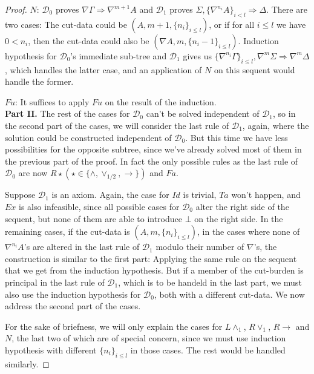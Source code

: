 \begin{proof}
   $N$: $\mathcal{D}_0$ proves $\nabla \Gamma \Rightarrow \nabla^{m+1} A$ and $\mathcal{D}_1$ proves $\Sigma, \{\nabla^{n_i} A\}_{i<l} \Rightarrow \Delta$. There are two cases: The cut-data could be $(A, m+1, \{n_i\}_{i \leq l})$, or if for all $i \leq l$ we have $0 < n_i$, then the cut-data could also be $(\nabla A, m, \{n_i-1\}_{i \leq l})$. Induction hypothesis for $\mathcal{D}_0$'s immediate sub-tree and $\mathcal{D}_1$ gives us $\{\nabla^{n_i}\Gamma\}_{i \leq l}, \nabla^m \Sigma \Rightarrow \nabla^m \Delta$, which handles the latter case, and an application of $N$ on this sequent would handle the former.
  
   $Fu$: It suffices to apply $Fu$ on the result of the induction.\\
  
   \textbf{Part II.} The rest of the cases for $\mathcal{D}_0$ can't be solved independent of $\mathcal{D}_1$, so in the second part of the cases, we will consider the last rule of $\mathcal{D}_1$, again, where the solution could be constructed independent of $\mathcal{D}_0$. But this time we have less possibilities for the opposite subtree, since we've already solved most of them in the previous part of the proof. In fact the only possible rules as the last rule of $\mathcal{D}_0$ are now $R\star (\star \in \{\wedge, \vee_{1/2}, \rightarrow\})$ and $Fa$.
  
   Suppose $\mathcal{D}_1$ is an axiom. Again, the case for $Id$ is trivial, $Ta$ won't happen, and $Ex$ is also infeasible, since all possible cases for $\mathcal{D}_0$ alter the right side of the sequent, but none of them are able to introduce $\bot$ on the right side.
   In the remaining cases, if the cut-data is $(A, m, \{n_i\}_{i \leq l})$, in the cases where none of $\nabla^{n_i} A$'s are altered in the last rule of $\mathcal{D}_1$ modulo their number of $\nabla$'s, the construction is similar to the first part: Applying the same rule on the sequent that we get from the induction hypothesis. But if a member of the cut-burden is principal in the last rule of $\mathcal{D}_1$, which is to be handeld in the last part, we must also use the induction hypothesis for $\mathcal{D}_0$, both with a different cut-data. We now address the second part of the cases.
   
   For the sake of briefness, we will only explain the cases for $L \wedge_1$, $R \vee_1$, $R \rightarrow$ and $N$, the last two of which are of special concern, since we must use induction hypothesis with different $\{n_i\}_{i \leq l}$ in those cases. The rest would be handled similarly.
  

\end{proof}
